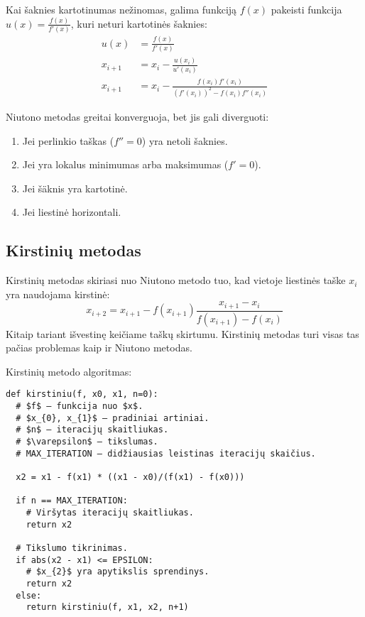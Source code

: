 Kai šaknies kartotinumas nežinomas, galima funkciją $f(x)$ pakeisti funkcija
$u(x) = \frac{f(x)}{f'(x)}$, kuri neturi kartotinės šaknies:
\begin{align*}
  u(x) &= \frac{f(x)}{f'(x)} \\
  x_{i+1} &= x_{i} - \frac{u(x_{i})}{u'(x_{i})} \\
  x_{i+1} &= x_{i} - 
    \frac{f(x_{i})f'(x_{i})}{(f'(x_{i}))^{2}-f(x_{i})f''(x_{i})}
\end{align*}


Niutono metodas greitai konverguoja, bet jis gali diverguoti:
\begin{enumerate}
  \item Jei perlinkio taškas ($f'' = 0$) yra netoli šaknies.
  \item Jei yra lokalus minimumas arba maksimumas ($f' = 0$).
  \item Jei šäknis yra kartotinė.
  \item Jei liestinė horizontali.
\end{enumerate}


\subsection{Kirstinių metodas}

\cite[40-42]{textbook}

Kirstinių metodas skiriasi nuo Niutono metodo tuo, kad vietoje liestinės taške
$x_{i}$ yra naudojama kirstinė:
\begin{equation*}
  x_{i+2} = x_{i+1} - f(x_{i+1})\frac{x_{i+1}-x_{i}}{f(x_{i+1}) - f(x_{i})}
\end{equation*}
Kitaip tariant išvestinę keičiame taškų skirtumu. Kirstinių
metodas turi visas tas pačias problemas kaip ir Niutono metodas.

Kirstinių metodo algoritmas:
\begin{verbatim}
def kirstiniu(f, x0, x1, n=0):
  # $f$ – funkcija nuo $x$.
  # $x_{0}, x_{1}$ – pradiniai artiniai.
  # $n$ – iteracijų skaitliukas.
  # $\varepsilon$ – tikslumas.
  # MAX_ITERATION – didžiausias leistinas iteracijų skaičius.

  x2 = x1 - f(x1) * ((x1 - x0)/(f(x1) - f(x0)))

  if n == MAX_ITERATION:
    # Viršytas iteracijų skaitliukas.
    return x2

  # Tikslumo tikrinimas.
  if abs(x2 - x1) <= EPSILON:
    # $x_{2}$ yra apytikslis sprendinys.
    return x2
  else:
    return kirstiniu(f, x1, x2, n+1)
\end{verbatim}

